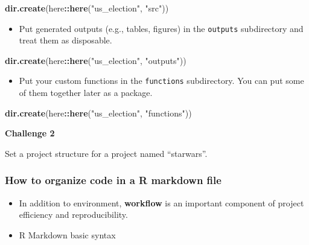 \documentclass[
]{book}
\newenvironment{Shaded}{\begin{snugshade}}{\end{snugshade}}
\newcommand{\KeywordTok}[1]{\textcolor[rgb]{0.13,0.29,0.53}{\textbf{#1}}}
\newcommand{\NormalTok}[1]{#1}
\newcommand{\OperatorTok}[1]{\textcolor[rgb]{0.81,0.36,0.00}{\textbf{#1}}}
\newcommand{\StringTok}[1]{\textcolor[rgb]{0.31,0.60,0.02}{#1}}
\providecommand{\tightlist}{%
  \setlength{\itemsep}{0pt}\setlength{\parskip}{0pt}}
\begin{document}
\begin{Shaded}
\begin{Highlighting}[]
\KeywordTok{dir.create}\NormalTok{(here}\OperatorTok{::}\KeywordTok{here}\NormalTok{(}\StringTok{"us\_election"}\NormalTok{, }\StringTok{"src"}\NormalTok{))}
\end{Highlighting}
\end{Shaded}

\begin{itemize}
\tightlist
\item
  Put generated outputs (e.g., tables, figures) in the \texttt{outputs} subdirectory and treat them as disposable.
\end{itemize}

\begin{Shaded}
\begin{Highlighting}[]
\KeywordTok{dir.create}\NormalTok{(here}\OperatorTok{::}\KeywordTok{here}\NormalTok{(}\StringTok{"us\_election"}\NormalTok{, }\StringTok{"outputs"}\NormalTok{))}
\end{Highlighting}
\end{Shaded}

\begin{itemize}
\tightlist
\item
  Put your custom functions in the \texttt{functions} subdirectory. You can put some of them together later as a package.
\end{itemize}

\begin{Shaded}
\begin{Highlighting}[]
\KeywordTok{dir.create}\NormalTok{(here}\OperatorTok{::}\KeywordTok{here}\NormalTok{(}\StringTok{"us\_election"}\NormalTok{, }\StringTok{"functions"}\NormalTok{))}
\end{Highlighting}
\end{Shaded}

\textbf{Challenge 2}

Set a project structure for a project named ``starwars''.

\hypertarget{how-to-organize-code-in-a-r-markdown-file}{%
\subsubsection{How to organize code in a R markdown file}\label{how-to-organize-code-in-a-r-markdown-file}}

\begin{itemize}
\item
  In addition to environment, \textbf{workflow} is an important component of project efficiency and reproducibility.
\item
  R Markdown basic syntax
\end{itemize}
\end{document}
